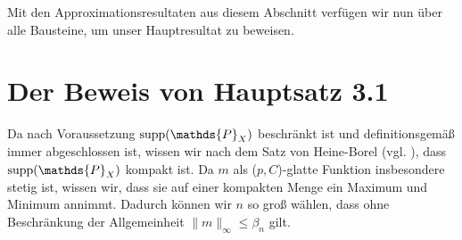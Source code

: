 Mit den Approximationsresultaten aus diesem Abschnitt verfügen wir nun über alle Bausteine, um unser Hauptresultat zu beweisen.

\section{Der Beweis von Hauptsatz 3.1}

Da nach Voraussetzung $\supp(\mathds{P}_X)$ beschränkt ist und definitionsgemäß immer abgeschlossen ist, wissen wir nach dem Satz von Heine-Borel (vgl. \cite[Satz 5]{forster2016}), dass $\supp(\mathds{P}_X)$ kompakt ist. Da $m$ als ($p,C$)-glatte Funktion insbesondere stetig ist, wissen wir, dass sie auf einer kompakten Menge ein Maximum und Minimum annimmt. Dadurch können wir $n$ so groß wählen, dass ohne Beschränkung der Allgemeinheit $\|m\|_{\infty} \leq \beta_n$ gilt.

